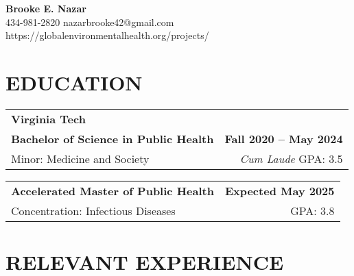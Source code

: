 \documentclass[10pt]{article}
\newcommand{\name}[1]{{\huge\textbf{#1}}}
\begin{document}
\begin{center}
\name{Brooke E. Nazar} \\
\large{434-981-2820 \textbar{} nazarbrooke42@gmail.com} \textbar{} https://globalenvironmentalhealth.org/projects/ \\
\end{center}

\vspace{6pt}


\section*{EDUCATION}

\noindent
\begin{tabularx}{\textwidth}{X r}
\textbf{Virginia Tech} \\
\textbf{Bachelor of Science in Public Health} & \textbf{Fall 2020 -- May 2024} \\
Minor: Medicine and Society & \textit{Cum Laude} \textbar{}  GPA: 3.5 \\

\end{tabularx}


\noindent
\begin{tabularx}{\textwidth}{X r}
\textbf{Accelerated Master of Public Health} & \textbf{Expected May 2025} \\
Concentration: Infectious Diseases & GPA: 3.8
\end{tabularx}

\section*{RELEVANT EXPERIENCE}
\end{document}
